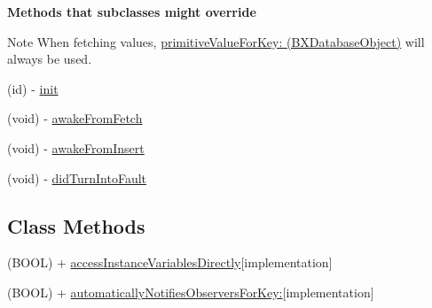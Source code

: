 \begin{Indent}{\bf Methods that subclasses might override}\par
{\em \begin{DoxyNote}{Note}
When fetching values, \hyperlink{interface_b_x_database_object_a0576661b8930420dce5248584dfc1add}{primitive\+Value\+For\+Key\+: (\+B\+X\+Database\+Object)} will always be used. 
\end{DoxyNote}
}\begin{DoxyCompactItemize}
\item 
\hypertarget{interface_b_x_database_object_adacc62fe9895e903abd1fc59cec4747b}{}(id) -\/ \hyperlink{interface_b_x_database_object_adacc62fe9895e903abd1fc59cec4747b}{init}\label{interface_b_x_database_object_adacc62fe9895e903abd1fc59cec4747b}

\item 
(void) -\/ \hyperlink{interface_b_x_database_object_a90389b13acef42186f2db93af6dec846}{awake\+From\+Fetch}
\item 
(void) -\/ \hyperlink{interface_b_x_database_object_a96552f2c3bf37a0cd4fdf0b168478721}{awake\+From\+Insert}
\item 
(void) -\/ \hyperlink{interface_b_x_database_object_a8a731aea00168c1e9467a184faf69310}{did\+Turn\+Into\+Fault}
\end{DoxyCompactItemize}
\end{Indent}
\subsection*{Class Methods}
\begin{DoxyCompactItemize}
\item 
\hypertarget{interface_b_x_database_object_af9bc7098dd9851cd0bc5a10d65e5b686}{}(B\+O\+O\+L) + \hyperlink{interface_b_x_database_object_af9bc7098dd9851cd0bc5a10d65e5b686}{access\+Instance\+Variables\+Directly}{\ttfamily  \mbox{[}implementation\mbox{]}}\label{interface_b_x_database_object_af9bc7098dd9851cd0bc5a10d65e5b686}

\item 
\hypertarget{interface_b_x_database_object_a7431be6ff93be18d354b37a426dc5144}{}(B\+O\+O\+L) + \hyperlink{interface_b_x_database_object_a7431be6ff93be18d354b37a426dc5144}{automatically\+Notifies\+Observers\+For\+Key\+:}{\ttfamily  \mbox{[}implementation\mbox{]}}\label{interface_b_x_database_object_a7431be6ff93be18d354b37a426dc5144}

\end{DoxyCompactItemize}


